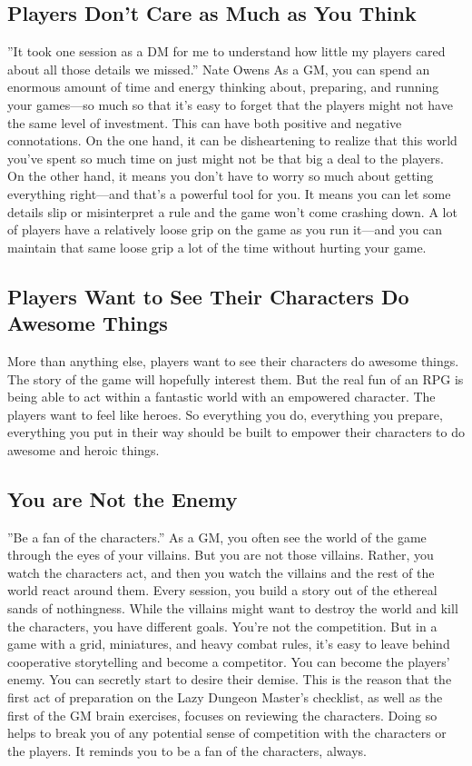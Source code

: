 \documentclass[10pt,a4paper,twoside,bg=print,twocolumn,openany,nodeprecatedcode]{dndbook}
\begin{document}
\subsection{Players Don't Care as Much as You Think}
\DndQuote%
{}
{''It took one session as a DM for me to understand how little my players cared about all those details we missed.''}
{Nate Owens}
As a GM, you can spend an enormous amount of time and energy thinking about, preparing, and running your games—so much so that it's easy to forget that the players might not have the same level of investment. This can have both positive and negative connotations.
On the one hand, it can be disheartening to realize that this world you've spent so much time on just might not be that big a deal to the players. On the other hand, it means you don't have to worry so much about getting everything right—and that's a powerful tool for you. It means you can let some details slip or misinterpret a rule and the game won't come crashing down.
A lot of players have a relatively loose grip on the game as you run it—and you can maintain that same loose grip a lot of the time without hurting your game.
\subsection{Players Want to See Their Characters Do Awesome Things}
More than anything else, players want to see their characters do awesome things. The story of the game will hopefully interest them. But the real fun of an RPG is being able to act within a fantastic world with an empowered character. The players want to feel like heroes. So everything you do, everything you prepare, everything you put in their way should be built to empower their characters to do awesome and heroic things.
\subsection{You are Not the Enemy}
\DndQuote%
{}
{''Be a fan of the characters.''}
{}
As a GM, you often see the world of the game through the eyes of your villains. But you are not those villains. Rather, you watch the characters act, and then you watch the villains and the rest of the world react around them. Every session, you build a story out of the ethereal sands of nothingness. While the villains might want to destroy the world and kill the characters, you have different goals.
You're not the competition. But in a game with a grid, miniatures, and heavy combat rules, it's easy to leave behind cooperative storytelling and become a competitor. You can become the players' enemy. You can secretly start to desire their demise.
This is the reason that the first act of preparation on the Lazy Dungeon Master's checklist, as well as the first of the GM brain exercises, focuses on reviewing the characters. Doing so helps to break you of any potential sense of competition with the characters or the players. It reminds you to be a fan of the characters, always.
\end{document}

